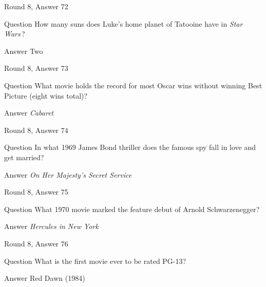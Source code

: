 \documentclass[11pt]{beamer}
\begin{document}
\begin{frame}[t]{Round 8, Answer 72}
\vspace{2em}
\begin{block}{Question}
How many suns does Luke's home planet of Tatooine have in \emph{Star Wars}\,?
\end{block}
\pause{}
\begin{block}{Answer}
Two
\end{block}
\end{frame}
    

\begin{frame}[t]{Round 8, Answer 73}
\vspace{2em}
\begin{block}{Question}
What movie holds the record for most Oscar wins without winning Best Picture (eight wins total)?
\end{block}
\pause{}
\begin{block}{Answer}
\emph{Cabaret}
\end{block}
\end{frame}
    

\begin{frame}[t]{Round 8, Answer 74}
\vspace{2em}
\begin{block}{Question}
In what 1969 James Bond thriller does the famous spy fall in love and get married?
\end{block}
\pause{}
\begin{block}{Answer}
\emph{On Her Majesty's Secret Service}
\end{block}
\end{frame}
    

\begin{frame}[t]{Round 8, Answer 75}
\vspace{2em}
\begin{block}{Question}
What 1970 movie marked the feature debut of Arnold Schwarzenegger?
\end{block}
\pause{}
\begin{block}{Answer}
\emph{Hercules in New York}
\end{block}
\end{frame}
    

\begin{frame}[t]{Round 8, Answer 76}
\vspace{2em}
\begin{block}{Question}
What is the first movie ever to be rated PG-13?
\end{block}
\pause{}
\begin{block}{Answer}
Red Dawn (1984)
\end{block}
\end{frame}
    
\end{document}
